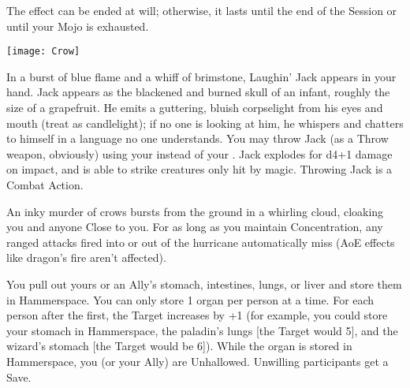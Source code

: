 The effect can be ended at will; otherwise, it lasts until the end of the Session or until your Mojo is exhausted.


  \begin{center}
  \texttt{[image: Crow]}
  \end{center}


\NECRO[
  Name=Laughin' Jack,
  Link=necromancy-laughin-jack,
  Paradigm=Death,
  Save=N,
  Duration=0,
  Target=2
]

In a burst of blue flame and a whiff of brimstone, Laughin' Jack appears in your hand.  Jack appears as the blackened and burned skull of an infant, roughly the size of a grapefruit.  He emits a guttering, bluish corpselight from his eyes and mouth (treat as candlelight); if no one is looking at him, he whispers and chatters to himself in a language no one understands.  You may throw Jack (as a Throw weapon, obviously) using your \FOC instead of your \DEX.  Jack explodes for d4+1 damage on impact, and is able to strike creatures only hit by magic.  Throwing Jack is a Combat Action.



\NECRO[
  Name=Storm of Crows,
  Link=necromancy-storm-of-crows,
  Paradigm=Death,
  Save=Y (neg.),
  Duration=Concentration,
  Target=3
]

An inky murder of crows bursts from the ground in a whirling cloud, cloaking you and anyone Close to you.  For as long as you maintain Concentration, any ranged attacks fired into or out of the hurricane automatically miss (AoE effects like dragon's fire aren't affected).  




\NECRO[
  Name=Canopic Jar,
  Link=necromancy-canopic-jar,
  Paradigm=Death,
  Save=N,
  Duration=Session,
  Target=4
]

You pull out yours or an Ally's stomach, intestines, lungs, or liver and store them in Hammerspace.  You can only store 1 organ per person at a time.  For each person after the first, the Target increases by +1 (for example, you could store your stomach in Hammerspace, the paladin's lungs [the Target would 5], and the wizard's stomach [the Target would be 6]).  While the organ is stored in Hammerspace, you (or your Ally) are Unhallowed.  Unwilling participants get a Save.




